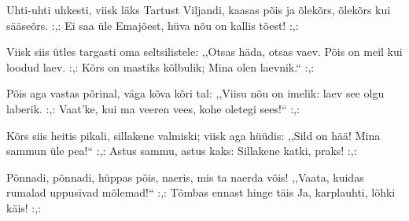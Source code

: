Uhti-uhti uhkesti,
viisk l\"aks Tartust Viljandi,
kaasas p\~ois ja \~olek\~ors,
\~olek\~ors kui s\"a\"ase\~ors.
:,: Ei saa \"ule Emaj\~oest,
h\"uva n\~ou on kallis t\~oest! :,:

Viisk siis \"utles targasti
oma seltsilistele:
{,,}Otsas h\"ada, otsas vaev.
P\~ois on meil kui loodud laev.
:,: K\~ors on mastiks k\~olbulik;
Mina olen laevnik.{``} :,:

P\~ois aga vastas p\~orinal,
v\"aga k\~ova k\~ori tal:
{,,}Viisu n\~ou on imelik:
laev see olgu laberik.
:,: Vaat'ke, kui ma veeren vees,
kohe oletegi sees!{``} :,:

K\~ors siis heitis pikali,
sillakene valmiski;
viisk aga h\"u\"udis: {,,}Sild on h\"a\"a!
Mina sammun \"ule pea!{``}
:,: Astus sammu, astus kaks:
Sillakene katki, praks! :,:

P\~onnadi, p\~onnadi, h\"uppas p\~ois,
naeris, mis ta naerda v\~ois!
{,,}Vaata, kuidas rumalad
uppusivad m\~olemad!{``}
:,: T\~ombas ennast hinge t\"ais
Ja, karplauhti, l\~ohki k\"ais! :,: